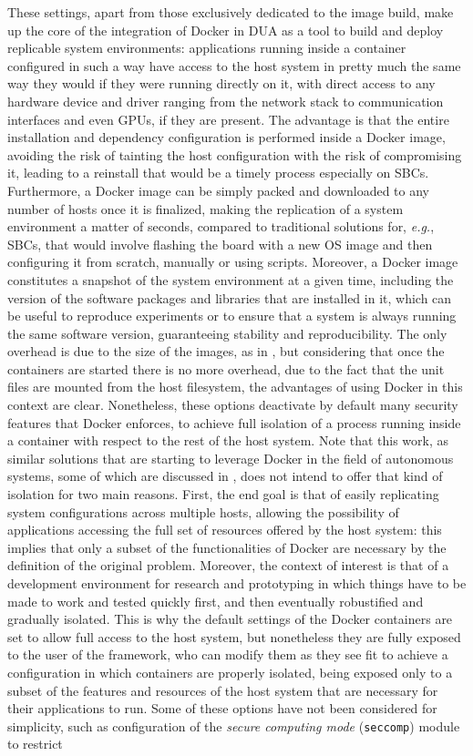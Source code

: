 These settings, apart from those exclusively dedicated to the image build, make up the core of the integration of Docker in DUA as a tool to build and deploy replicable system environments: applications running inside a container configured in such a way have access to the host system in pretty much the same way they would if they were running directly on it, with direct access to any hardware device and driver ranging from the network stack to communication interfaces and even GPUs, if they are present. The advantage is that the entire installation and dependency configuration is performed inside a Docker image, avoiding the risk of tainting the host configuration with the risk of compromising it, leading to a reinstall that would be a timely process especially on SBCs. Furthermore, a Docker image can be simply packed and downloaded to any number of hosts once it is finalized, making the replication of a system environment a matter of seconds, compared to traditional solutions for, \emph{e.g.}, SBCs, that would involve flashing the board with a new OS image and then configuring it from scratch, manually or using scripts. Moreover, a Docker image constitutes a snapshot of the system environment at a given time, including the version of the software packages and libraries that are installed in it, which can be useful to reproduce experiments or to ensure that a system is always running the same software version, guaranteeing stability and reproducibility. The only overhead is due to the size of the images, as in , but considering that once the containers are started there is no more overhead, due to the fact that the unit files are mounted from the host filesystem, the advantages of using Docker in this context are clear. Nonetheless, these options deactivate by default many security features that Docker enforces, to achieve full isolation of a process running inside a container with respect to the rest of the host system. Note that this work, as similar solutions that are starting to leverage Docker in the field of autonomous systems, some of which are discussed in , does not intend to offer that kind of isolation for two main reasons. First, the end goal is that of easily replicating system configurations across multiple hosts, allowing the possibility of applications accessing the full set of resources offered by the host system: this implies that only a subset of the functionalities of Docker are necessary by the definition of the original problem. Moreover, the context of interest is that of a development environment for research and prototyping in which things have to be made to work and tested quickly first, and then eventually robustified and gradually isolated. This is why the default settings of the Docker containers are set to allow full access to the host system, but nonetheless they are fully exposed to the user of the framework, who can modify them as they see fit to achieve a configuration in which containers are properly isolated, being exposed only to a subset of the features and resources of the host system that are necessary for their applications to run. Some of these options have not been considered for simplicity, such as configuration of the \emph{secure computing mode} (\texttt{seccomp}) module to restrict 